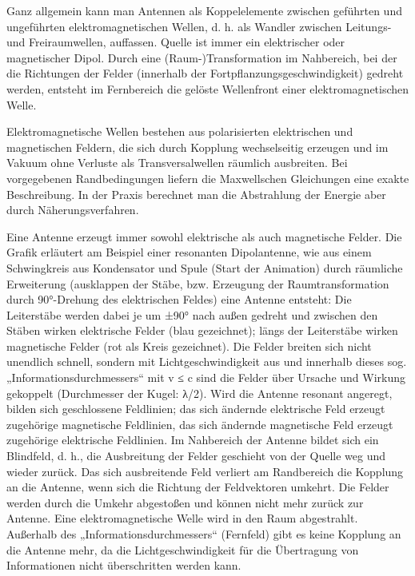 Ganz allgemein kann man Antennen als Koppelelemente zwischen geführten und ungeführten elektromagnetischen Wellen, d. h. als Wandler zwischen Leitungs- und Freiraumwellen, auffassen. Quelle ist immer ein elektrischer oder magnetischer Dipol. Durch eine (Raum-)Transformation im Nahbereich, bei der die Richtungen der Felder (innerhalb der Fortpflanzungsgeschwindigkeit) gedreht werden, entsteht im Fernbereich die gelöste Wellenfront einer elektromagnetischen Welle. 

Elektromagnetische Wellen bestehen aus polarisierten elektrischen und magnetischen Feldern, die sich durch Kopplung wechselseitig erzeugen und im Vakuum ohne Verluste als Transversalwellen räumlich ausbreiten. Bei vorgegebenen Randbedingungen liefern die Maxwellschen Gleichungen eine exakte Beschreibung. In der Praxis berechnet man die Abstrahlung der Energie aber durch Näherungsverfahren. 

Eine Antenne erzeugt immer sowohl elektrische als auch magnetische Felder. Die Grafik erläutert am Beispiel einer resonanten Dipolantenne, wie aus einem Schwingkreis aus Kondensator und Spule (Start der Animation) durch räumliche Erweiterung (ausklappen der Stäbe, bzw. Erzeugung der Raumtransformation durch 90°-Drehung des elektrischen Feldes) eine Antenne entsteht: Die Leiterstäbe werden dabei je um ±90° nach außen gedreht und zwischen den Stäben wirken elektrische Felder (blau gezeichnet); längs der Leiterstäbe wirken magnetische Felder (rot als Kreis gezeichnet). Die Felder breiten sich nicht unendlich schnell, sondern mit Lichtgeschwindigkeit aus und innerhalb dieses sog. „Informationsdurchmessers“ mit v ≤ c sind die Felder über Ursache und Wirkung gekoppelt (Durchmesser der Kugel: λ/2). Wird die Antenne resonant angeregt, bilden sich geschlossene Feldlinien; das sich ändernde elektrische Feld erzeugt zugehörige magnetische Feldlinien, das sich ändernde magnetische Feld erzeugt zugehörige elektrische Feldlinien. Im Nahbereich der Antenne bildet sich ein Blindfeld, d. h., die Ausbreitung der Felder geschieht von der Quelle weg und wieder zurück. Das sich ausbreitende Feld verliert am Randbereich die Kopplung an die Antenne, wenn sich die Richtung der Feldvektoren umkehrt. Die Felder werden durch die Umkehr abgestoßen und können nicht mehr zurück zur Antenne. Eine elektromagnetische Welle wird in den Raum abgestrahlt. Außerhalb des „Informationsdurchmessers“ (Fernfeld) gibt es keine Kopplung an die Antenne mehr, da die Lichtgeschwindigkeit für die Übertragung von Informationen nicht überschritten werden kann. 



